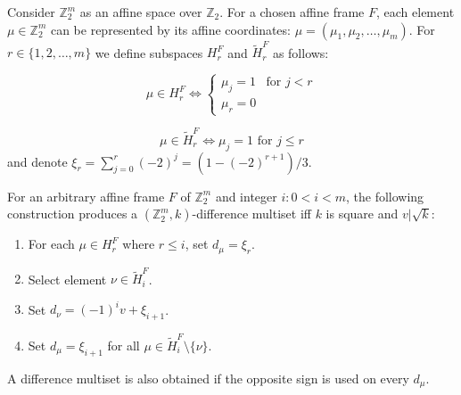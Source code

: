 Consider $\mathbb Z_2^m$ as an affine space over $\mathbb Z_2$. For a chosen affine frame $F$, each element $\mu\in\mathbb Z_2^m$ can be represented by its affine coordinates: $\mu=(\mu_1, \mu_2, \ldots, \mu_m)$. For $r\in\{1,2,\ldots,m\}$ we define subspaces $H_r^F$ and $\widetilde H_r^F$ as follows:

\begin{equation}
    \mu \in H_r^F \iff 
        \begin{cases}
            \mu_j = 1 & \text{for } j < r \\
            \mu_r = 0
        \end{cases}
\end{equation}

\begin{equation}
    \mu \in \widetilde H_r^F \iff 
        \mu_j = 1 \text{ for } j \leq r
\end{equation}
and denote $\xi_r = \sum\limits_{j=0}^r (-2)^j=(1-(-2)^{r+1})/3$.

\begin{theorem}
    \label{z2i:theorem:construction}
    For an arbitrary affine frame $F$ of $\mathbb Z_2^m$ and integer $i \colon 0 < i < m$, the following construction produces a $(\mathbb Z_2^m, k)$-difference multiset iff $k$ is square and $v | \sqrt k$:
    \begin{enumerate}
        \item For each $\mu \in H_r^F$ where $r \leq i$, set $d_\mu = \xi_r$.
        \item Select element $\nu \in \widetilde H_i^F$.
        \item Set $d_\nu = (-1)^i v + \xi_{i+1}$.
        \item Set $d_\mu = \xi_{i+1}$ for all $\mu \in \widetilde H_i^F\setminus\{\nu\}$.
    \end{enumerate}
    A difference multiset is also obtained if the opposite sign is used on every $d_\mu$.
\end{theorem}

